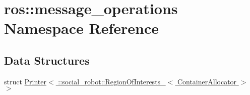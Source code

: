 \hypertarget{namespaceros_1_1message__operations}{
\section{ros::message\_\-operations Namespace Reference}
\label{namespaceros_1_1message__operations}
}
\subsection*{Data Structures}
\begin{DoxyCompactItemize}
\item 
struct \hyperlink{structros_1_1message__operations_1_1Printer_3_01_1_1social__robot_1_1RegionOfInterests___3_01ContainerAllocator_01_4_01_4}{Printer$<$ ::social\_\-robot::RegionOfInterests\_\-$<$ ContainerAllocator $>$ $>$}
\end{DoxyCompactItemize}
